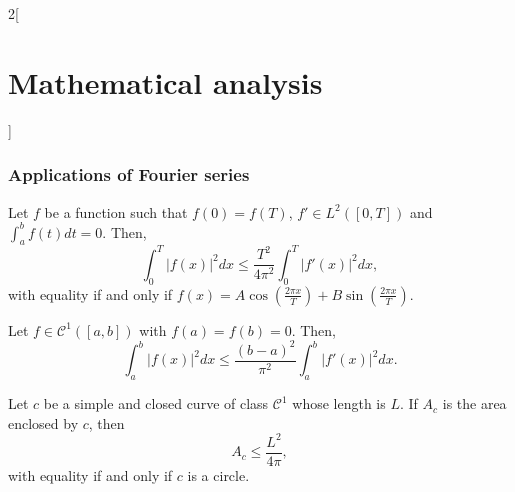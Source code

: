 \documentclass[class=article,crop=false]{standalone}
\begin{document}
\begin{multicols}{2}[\section{Mathematical analysis}]
\subsubsection*{Applications of Fourier series}
\begin{theorem}
Let $f$ be a function such that $f(0)=f(T)$, $f'\in L^2([0,T])$ and $\displaystyle\int_a^bf(t)dt=0$. Then, $$\int_0^T|f(x)|^2dx\leq\frac{T^2}{4\pi^2}\int_0^T|f'(x)|^2dx,$$ with equality if and only if $\displaystyle f(x)=A\cos\left(\frac{2\pi x}{T}\right)+B\sin\left(\frac{2\pi x}{T}\right)$.
\end{theorem}
\begin{theorem}
Let $f\in \mathcal{C}^1([a,b])$ with $f(a)=f(b)=0$. Then, $$\int_a^b|f(x)|^2dx\leq\frac{(b-a)^2}{\pi^2}\int_a^b|f'(x)|^2dx.$$
\end{theorem}
\begin{theorem}
Let $c$ be a simple and closed curve of class $\mathcal{C}^1$ whose length is $L$. If $A_c$ is the area enclosed by $c$, then $$A_c\leq\frac{L^2}{4\pi},$$ with equality if and only if $c$ is a circle.
\end{theorem}
\end{multicols}
\end{document}
